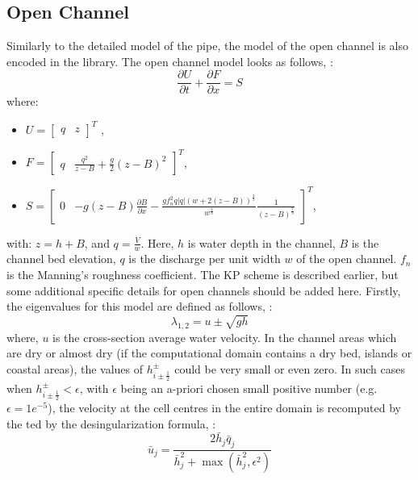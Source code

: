 \documentclass[%
]{USN-PhD}
\begin{document}
\subsection{Open Channel}

Similarly to the detailed model of the pipe, the model of the open channel is also encoded in the library. The open channel model looks as follows, \cite{Sha:15,Vyt:17}:
 \begin{equation}
\frac{\partial U}{\partial t}+\frac{\partial F}{\partial x} = S
\end{equation}
where:\begin{itemize}
\item[] $U=\left[\begin{matrix}q & z\end{matrix}\right]^T$ ,
\item[] $F=\left[\begin{matrix}q & \frac{q^2}{z-B}+\frac{g}{2}\left(z-B\right)^2\end{matrix}\right]^T$,
\item[] $S=\left[\begin{matrix}0 & -g\left(z-B\right)\frac{\partial B}{\partial x}-\frac{gf_n^2q|q|\left(w+2\left(z-B\right)\right)^\frac{4}{3}}{w^\frac{4}{3}}\frac{1}{\left(z-B\right)^\frac{7}{3}}\end{matrix}\right]^T$,
\end{itemize}
with: $z=h+B$, and $q=\frac{\dot{V}}{w}$. Here, $h$ is water depth in the channel, $B$ is the channel bed elevation, $q$ is the discharge per unit width $w$ of the open channel. $f_n$ is the Manning's roughness coefficient. The KP scheme is described earlier, but some additional specific details for open channels should be added here. Firstly, the eigenvalues for this model are defined as follows, \cite{Sha:15}:
\begin{equation}
\lambda_{1,2}=u\pm\sqrt{gh}
\end{equation}
where, $u$ is the cross-section average water velocity. In the channel areas which are dry or almost dry (if the computational domain contains a dry bed, islands or coastal areas), the values of $h_{i\pm\frac{1}{2}}^\pm$ could be very small or even zero. In such cases when $h_{i\pm\frac{1}{2}}^\pm<\epsilon$, with $\epsilon$ being an a-priori chosen small positive number (e.g. $\epsilon = 1e^{-5}$), the velocity at the cell centres in the entire domain is recomputed by the ted by the desingularization formula, \cite{Sha:15}:
\begin{equation}
\bar{u}_j=\frac{2\bar{h}_j\bar{q}_j}{\bar{h}_j^2+\max\left(\bar{h}_j^2,\epsilon^2\right)}
\end{equation}
\end{document}
